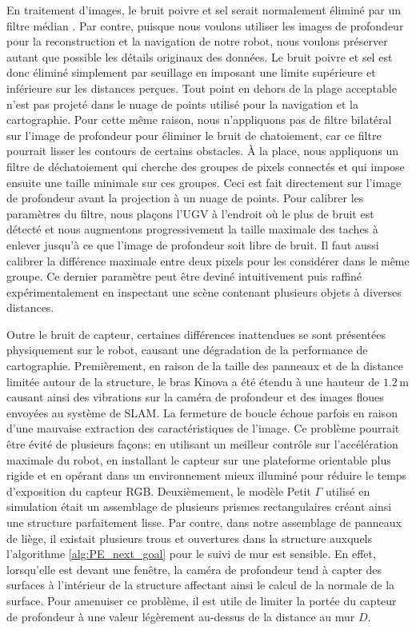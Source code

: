 En traitement d'images, le bruit poivre et sel serait normalement éliminé par un filtre médian \citep{jayaraman2009digital}. Par contre, puisque nous voulons utiliser les images de profondeur pour la reconstruction et la navigation de notre robot, nous voulons préserver autant que possible les détails originaux des données. Le bruit poivre et sel est donc éliminé simplement par seuillage en imposant une limite supérieure et inférieure sur les distances perçues. Tout point en dehors de la plage acceptable n'est pas projeté dans le nuage de points utilisé pour la navigation et la cartographie. Pour cette même raison, nous n'appliquons pas de filtre bilatéral sur l'image de profondeur pour éliminer le bruit de chatoiement, car ce filtre pourrait lisser les contours de certains obstacles. À la place, nous appliquons un filtre de déchatoiement qui cherche des groupes de pixels connectés et qui impose ensuite une taille minimale sur ces groupes. Ceci est fait directement sur l'image de profondeur avant la projection à un nuage de points. Pour calibrer les paramètres du filtre, nous plaçons l'UGV à l'endroit où le plus de bruit est détecté et nous augmentons progressivement la taille maximale des taches à enlever jusqu'à ce que l'image de profondeur soit libre de bruit. Il faut aussi calibrer la différence maximale entre deux pixels pour les considérer dans le même groupe. Ce dernier paramètre peut être deviné intuitivement puis raffiné expérimentalement en inspectant une scène contenant plusieurs objets à diverses distances.

Outre le bruit de capteur, certaines différences inattendues se sont présentées physiquement sur le robot, causant une dégradation de la performance de cartographie. Premièrement, en raison de la taille des panneaux et de la distance limitée autour de la structure, le bras Kinova a été étendu à une hauteur de $1.2\, \mathrm{m}$ causant ainsi des vibrations sur la caméra de profondeur et des images floues envoyées au système de SLAM. La fermeture de boucle échoue parfois en raison d'une mauvaise extraction des caractéristiques de l'image. Ce problème pourrait être évité de plusieurs façons: en utilisant un meilleur contrôle sur l'accélération maximale du robot, en installant le capteur sur une plateforme orientable plus rigide et en opérant dans un environnement mieux illuminé pour réduire le temps d'exposition du capteur RGB. Deuxièmement, le modèle Petit $\Gamma$ utilisé en simulation était un assemblage de plusieurs prismes rectangulaires créant ainsi une structure parfaitement lisse. Par contre, dans notre assemblage de panneaux de liège, il existait plusieurs trous et ouvertures dans la structure auxquels l'algorithme \ref{alg:PE_next_goal} pour le suivi de mur est sensible. En effet, lorsqu'elle est devant une fenêtre, la caméra de profondeur tend à capter des surfaces à l'intérieur de la structure affectant ainsi le calcul de la normale de la surface. Pour amenuiser ce problème, il est utile de limiter la portée du capteur de profondeur à une valeur légèrement au-dessus de la distance au mur $D$.

